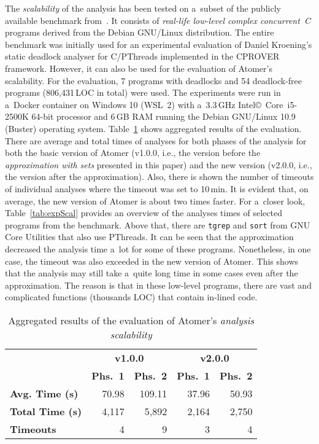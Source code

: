 \documentclass{ExcelAtFIT}
\theoremstyle{example}
\begin{document}
The \emph{scalability} of the analysis has been tested on a~subset of the publicly available benchmark from~\cite{deadlockKroening}. It consists of \emph{real-life low-level complex concurrent~C} programs derived from the Debian GNU/Linux distribution. The entire benchmark was initially used for an experimental evaluation of Daniel Kroening's static deadlock analyser for C/PThreads implemented in the CPROVER framework. However, it can also be used for the evaluation of Atomer's scalability. For the evaluation, 7 programs with deadlocks and 54 deadlock-free programs (806,431\,LOC in total) were used. The experiments were run in a~Docker container on Windows 10 (WSL~2) with a~3.3\,GHz Intel\copyright\ Core\texttrademark\ i5-2500K 64-bit processor and 6\,GB RAM running the Debian GNU/Linux 10.9 (Buster) operating system. Table~\ref{tab:expScalAgg} shows aggregated results of the evaluation. There are average and total times of analyses for both phases of the analysis for both the basic version of Atomer (v1.0.0, i.e., the version before the \emph{approximation with sets} presented in this paper) and the new version (v2.0.0, i.e., the version after the approximation). Also, there is shown the number of timeouts of individual analyses where the timeout was set to 10\,min. It is evident that, on average, the new version of Atomer is about two times faster. For a~closer look, Table~\ref{tab:expScal} provides an overview of the analyses times of selected programs from the benchmark. Above that, there are \texttt{tgrep} and \texttt{sort} from GNU Core Utilities that also use PThreads. It can be seen that the approximation decreased the analysis time a~lot for some of these programs. Nonetheless, in one case, the timeout was also exceeded in the new version of Atomer. This shows that the analysis may still take a~quite long time in some cases even after the approximation. The reason is that in these low-level programs, there are vast and complicated functions (thousands LOC) that contain in-lined code.

\begin{table}[hbt]
    \centering

    \begin{tabular}{|l||r|r|r|r|}
        \hline
        \multirow{2}{*}{} & \multicolumn{2}{c|}{\textbf{v1.0.0}} & \multicolumn{2}{c|}{\textbf{v2.0.0}} \\ \cline{2-5}
        & \textbf{Phs.~1} & \textbf{Phs.~2} & \textbf{Phs.~1} & \textbf{Phs.~2} \\ \hline \hline
        \textbf{Avg. Time (s)} & 70.98 & 109.11 & 37.96 & 50.93 \\ \hline
        \textbf{Total Time (s)} & 4,117 & 5,892 & 2,164 & 2,750 \\ \hline
        \textbf{Timeouts} & 4 & 9 & 3 & 4 \\ \hline
    \end{tabular}

    \caption{Aggregated results of the evaluation of Atomer's \emph{analysis scalability}}
    \label{tab:expScalAgg}
\end{table}
\end{document}
